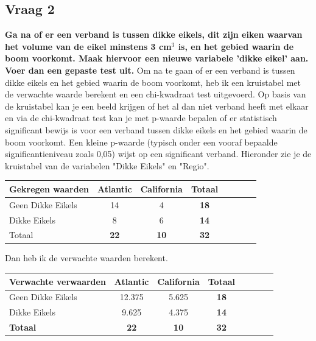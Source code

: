 \documentclass[12pt]{article}
\begin{document}
\subsection{Vraag 2}
\textbf{Ga na of er een verband is tussen dikke eikels, dit zijn eiken waarvan het volume van de eikel minstens 3 cm$^3$ is, en het gebied waarin de boom voorkomt. Maak hiervoor een nieuwe variabele ’dikke eikel’ aan. Voer dan een gepaste test uit.}
\newline\newline
Om na te gaan of er een verband is tussen dikke eikels en het gebied waarin de boom voorkomt, heb ik een kruistabel met de verwachte waarde berekent en een chi-kwadraat test uitgevoerd.
Op basis van de kruistabel kan je een beeld krijgen of het al dan niet verband heeft met elkaar en via de chi-kwadraat test kan je met p-waarde bepalen of er statistisch significant bewijs is voor een verband tussen dikke eikels en het gebied waarin de boom voorkomt. 
Een kleine p-waarde (typisch onder een vooraf bepaalde significantieniveau zoals 0,05) wijst op een significant verband.
Hieronder zie je de kruistabel van de variabelen "Dikke Eikels" en "Regio".
\newline\newline
\begin{tabular}{l*{6}{c}r}
    \textbf{Gekregen waarden} & Atlantic & California & Totaal \\
    \hline
    Geen Dikke Eikels & 14 & 4 & \textbf{18} \\
    Dikke Eikels & 8 & 6 & \textbf{14} \\
    Totaal & \textbf{22} & \textbf{10} & \textbf{32} \\
\end{tabular}
\newline\newline
Dan heb ik de verwachte waarden berekent.
\newline\newline
\begin{tabular}{l*{6}{c}r}
   \textbf{Verwachte verwaarden} & Atlantic & California & Totaal \\
   \hline
   Geen Dikke Eikels & 12.375 & 5.625 & \textbf{18} \\
   Dikke Eikels & 9.625 & 4.375 & \textbf{14} \\
   \textbf{Totaal} & \textbf{22} & \textbf{10} & \textbf{32} \\
\end{tabular}
\newline\newline
\end{document}

